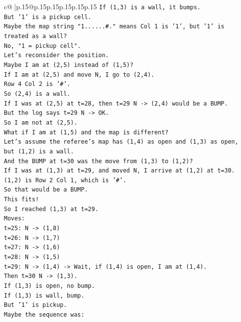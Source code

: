 \documentclass{article}
\begin{document}
{\begin{supertabular}{c@{$\;$}|p{.15\linewidth}@{}p{.15\linewidth}p{.15\linewidth}p{.15\linewidth}p{.15\linewidth}p{.15\linewidth}}
{{{\texttt{If (1,3) is a wall, it bumps.} \\
\texttt{But '1' is a pickup cell.} \\
\texttt{Maybe the map string "1......\#." means Col 1 is '1', but '1' is treated as a wall?} \\
\texttt{No, "1 = pickup cell".} \\
\texttt{Let's reconsider the position.} \\
\texttt{Maybe I am at (2,5) instead of (1,5)?} \\
\texttt{If I am at (2,5) and move N, I go to (2,4).} \\
\texttt{Row 4 Col 2 is '\#'.} \\
\texttt{So (2,4) is a wall.} \\
\texttt{If I was at (2,5) at t=28, then t=29 N {-}> (2,4) would be a BUMP.} \\
\texttt{But the log says t=29 N {-}> OK.} \\
\texttt{So I am not at (2,5).} \\
\texttt{What if I am at (1,5) and the map is different?} \\
\texttt{Let's assume the referee's map has (1,4) as open and (1,3) as open, but (1,2) is a wall.} \\
\texttt{And the BUMP at t=30 was the move from (1,3) to (1,2)?} \\
\texttt{If I was at (1,3) at t=29, and moved N, I arrive at (1,2) at t=30.} \\
\texttt{(1,2) is Row 2 Col 1, which is '\#'.} \\
\texttt{So that would be a BUMP.} \\
\texttt{This fits!} \\
\texttt{So I reached (1,3) at t=29.} \\
\texttt{Moves:} \\
\texttt{t=25: N {-}> (1,8)} \\
\texttt{t=26: N {-}> (1,7)} \\
\texttt{t=27: N {-}> (1,6)} \\
\texttt{t=28: N {-}> (1,5)} \\
\texttt{t=29: N {-}> (1,4) {-}> Wait, if (1,4) is open, I am at (1,4).} \\
\texttt{Then t=30 N {-}> (1,3).} \\
\texttt{If (1,3) is open, no bump.} \\
\texttt{If (1,3) is wall, bump.} \\
\texttt{But '1' is pickup.} \\
\texttt{Maybe the sequence was:} \\
}}}
\end{supertabular}}
\end{document}
